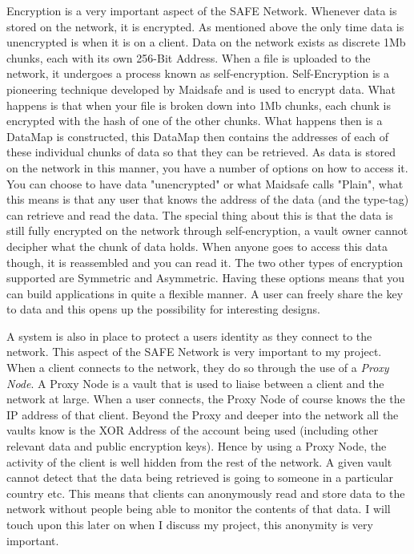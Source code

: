 Encryption is a very important aspect of the SAFE Network. Whenever data is stored on the network, it is encrypted. As mentioned above the only time data is unencrypted is when it is on a client. Data on the network exists as discrete 1Mb chunks, each with its own 256-Bit Address. When a file is uploaded to the network, it undergoes a process known as self-encryption. Self-Encryption is a pioneering technique developed by Maidsafe and is used to encrypt data. What happens is that when your file is broken down into 1Mb chunks, each chunk is encrypted with the hash of one of the other chunks. What happens then is a DataMap is constructed, this DataMap then contains the addresses of each of these individual chunks of data so that they can be retrieved. As data is stored on the network in this manner, you have a number of options on how to access it. You can choose to have data "unencrypted" or what Maidsafe calls "Plain", what this means is that any user that knows the address of the data (and the type-tag) can retrieve and read the data. The special thing about this is that the data is still fully encrypted on the network through self-encryption, a vault owner cannot decipher what the chunk of data holds. When anyone goes to access this data though, it is reassembled and you can read it. The two other types of encryption supported are Symmetric and Asymmetric. Having these options means that you can build applications in quite a flexible manner. A user can freely share the key to data and this opens up the possibility for interesting designs.

A system is also in place to protect a users identity as they connect to the network. This aspect of the SAFE Network is very important to my project. When a client connects to the network, they do so through the use of a \textit{Proxy Node}. A Proxy Node is a vault that is used to liaise between a client and the network at large. When a user connects, the Proxy Node of course knows the the IP address of that client. Beyond the Proxy and deeper into the network all the vaults know is the XOR Address of the account being used (including other relevant data and public encryption keys). Hence by using a Proxy Node, the activity of the client is well hidden from the rest of the network. A given vault cannot detect that the data being retrieved is going to someone in a particular country etc. This means that clients can anonymously read and store data to the network without people being able to monitor the contents of that data. I will touch upon this later on when I discuss my project, this anonymity is very important.

